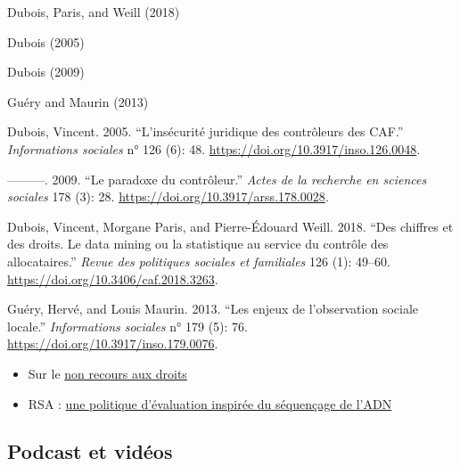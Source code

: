 \documentclass[
  letterpaper,
  DIV=11,
  numbers=noendperiod]{scrreprt}
\newlength{\cslhangindent}
\newlength{\cslentryspacingunit} %
\newenvironment{CSLReferences}[2] %
 {%
  \setlength{\parindent}{0pt}
  \ifodd #1
  \let\oldpar\par
  \def\par{\hangindent=\cslhangindent\oldpar}
  \fi
  \setlength{\parskip}{#2\cslentryspacingunit}
 }%
 {}
\begin{document}
\leavevmode{}%
\begin{CSLReferences}{1}{0}
Dubois, Paris, and Weill (2018)

Dubois (2005)

Dubois (2009)

Guéry and Maurin (2013)

\leavevmode{}%
Dubois, Vincent. 2005. {``L'insécurité juridique des contrôleurs des
CAF.''} \emph{Informations sociales} n° 126 (6): 48.
\url{https://doi.org/10.3917/inso.126.0048}.

\leavevmode{}%
---------. 2009. {``Le paradoxe du contrôleur.''} \emph{Actes de la
recherche en sciences sociales} 178 (3): 28.
\url{https://doi.org/10.3917/arss.178.0028}.

\leavevmode{}%
Dubois, Vincent, Morgane Paris, and Pierre-Édouard Weill. 2018. {``Des
chiffres et des droits. Le data mining ou la statistique au service du
contrôle des allocataires.''} \emph{Revue des politiques sociales et
familiales} 126 (1): 49--60.
\url{https://doi.org/10.3406/caf.2018.3263}.

\leavevmode{}%
Guéry, Hervé, and Louis Maurin. 2013. {``Les enjeux de l'observation
sociale locale.''} \emph{Informations sociales} n° 179 (5): 76.
\url{https://doi.org/10.3917/inso.179.0076}.

\end{CSLReferences}

\begin{itemize}
\item
  Sur le
  \href{https://blog.landot-avocats.net/2023/08/16/experimentation-territoriale-visant-a-reduire-le-non-recours-aux-droits-sociaux-decret-dapplication-de-lart-133-de-la-loi-3ds-puis-arrete/}{non
  recours aux droits}
\item
  RSA :
  \href{http://www.lagazettedescommunes.com/604013/rsa-en-loire-atlantique-une-politique-devaluation-inspiree-du-sequencage-de-ladn/?abo=1}{une
  politique d'évaluation inspirée du séquençage de l'ADN}
\end{itemize}

\hypertarget{podcast-et-viduxe9os}{%
\subsection*{Podcast et vidéos}\label{podcast-et-viduxe9os}}
\end{document}
